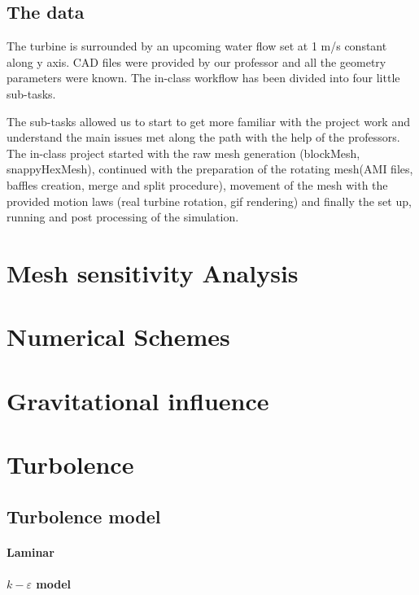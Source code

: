 \documentclass[a4paper,12pt]{article}
\begin{document}
\subsection{The data}
The turbine is surrounded by an upcoming water flow set at 1 m/s constant along y axis. 
CAD files were provided by our professor and all the geometry parameters were known.
The in-class workflow has been divided into four little sub-tasks. 

The sub-tasks allowed us to start to get more familiar with the project work and understand the main issues met along the path with the help of the professors. The in-class project started with the raw mesh generation (blockMesh, snappyHexMesh), continued with the preparation of the rotating mesh(AMI files, baffles creation, merge and split procedure), movement of the mesh with the provided motion laws  (real turbine rotation, gif rendering) and finally the set up, running and post processing of the simulation.

\section{Mesh sensitivity Analysis}


\section{Numerical Schemes}

\section{Gravitational influence}

\section{Turbolence}

\subsection{Turbolence model}

\paragraph{Laminar}

\paragraph{$k-\varepsilon$ model}
\end{document}
